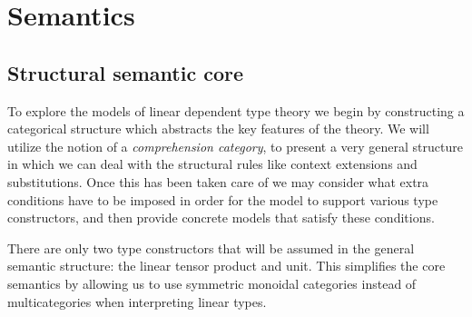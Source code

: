 \documentclass[a4paper,english]{lipics-v2018}
\begin{document}
\section{Semantics}\label{semantics}
\subsection{Structural semantic core}
To explore the models of linear dependent type theory we begin by constructing a categorical structure which abstracts the key features of the theory. We will utilize the notion of a \textit{comprehension category}, to present a very general structure in which we can deal with the structural rules like context extensions and substitutions. Once this has been taken care of we may consider what extra conditions have to be imposed in order for the model to support various type constructors, and then provide concrete models that satisfy these conditions.


There are only two type constructors that will be assumed in the general semantic structure: the linear tensor product and unit. This simplifies the core semantics by allowing us to use symmetric monoidal categories instead of multicategories when interpreting linear types.
\end{document}

